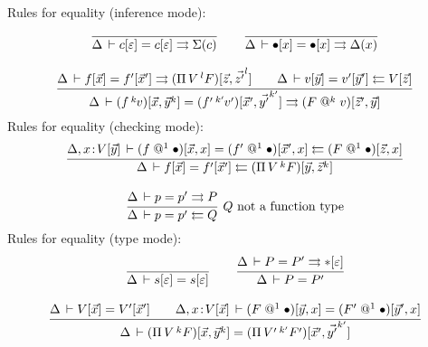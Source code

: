 \documentclass[a4paper]{article}
\makeatletter
\newcommand{\oann}[1]{{}^{#1}\kern-0.15ex}
\newcommand{\ovar}{\mathord{\bullet}}
\newcommand{\oapp}[1]{\,\oann{#1}}
\newcommand{\opi}[2]{\Pi\,#1\,^{#2}}
\renewcommand{\sempty}{\varepsilon}
\newcommand{\oclos}[2]{#1[#2]}
\newcommand{\oclosp}[2]{(#1)[#2]}
\newcommand{\vapp}[1]{\mathrel{@^{#1}}}
\makeatother
\begin{document}
Rules for equality (inference mode):
\begin{gather*}
  \ru{}{\Delta \der \oclos c \sempty = \oclos c \sempty \jinf \Sigma(c)}
\qquad
  \ru{}{\Delta \der \oclos \ovar x = \oclos \ovar x \jinf \Delta(x)}
\\[2ex]
  \ru{\Delta \der \oclos f {\vec x} = \oclos {f'}{\vec x'} \jinf
        \oclosp{\opi V l F}{\vec z,{\vec {z'}}^l} \qquad
      \Delta \der \oclos v {\vec y} = \oclos {v'}{\vec y'} \jchk
        \oclos V {\vec z}
    }{\Delta \der \oclosp {f \oapp k v}{\vec x,\vec y^k}
                = \oclosp {f' \oapp {k'} v'}{\vec x',{\vec {y'}}^{k'}}
                \jinf \oclosp{F \vapp{k} v}{\vec z',\vec y}
    }
\end{gather*}
Rules for equality (checking mode):
\begin{gather*}
  \ru{\Delta, x \of \oclos V {\vec y} \der
        \oclosp {f  \vapp 1 \ovar}{\vec x ,x} =
        \oclosp {f' \vapp 1 \ovar}{\vec x',x}  \jchk
        \oclosp {F  \vapp 1 \ovar}{\vec z, x}
    }{\Delta \der \oclos f {\vec x} = \oclos {f'} {\vec x'}
          \jchk \oclosp {\opi V k F}{\vec y,\vec z^k}}
\\[2ex]
  \rux{\Delta \der p = p' \jinf P
     }{\Delta \der p = p' \jchk Q
     }{Q \mbox{ not a function type}}
\end{gather*}
Rules for equality (type mode):
\begin{gather*}
  \ru{}{\Delta \der \oclos s \sempty = \oclos s \sempty}
\qquad
  \ru{\Delta \der P = P' \jinf \oclos \ttype \sempty
    }{\Delta \der P = P'}
\\[2ex]
  \ru{\Delta \der \oclos V {\vec x} = \oclos {V'}{\vec x'} \qquad
      \Delta, x\of\oclos V {\vec x} \der
         \oclosp{F  \vapp 1 \ovar}{\vec y,x} =
         \oclosp{F' \vapp 1 \ovar}{\vec y',x}
    }{\Delta \der \oclosp {\opi {V }{k }{F }}{\vec x ,\vec y^k}
               =  \oclosp {\opi {V'}{k'}{F'}}{\vec x',\vec {y'}^{k'}}
    }
\end{gather*}
\end{document}
